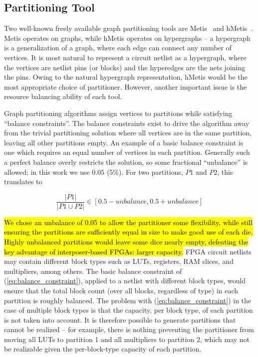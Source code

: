 \subsection{Partitioning Tool}
Two well-known freely available graph partitioning tools are Metis~\cite{karypis1998multilevelmetis} and hMetis~\cite{karypis1999multilevelhmetis}. Metis operates on graphs, while hMetis operates on hypergraphs -- a hypergraph is a generalization of a graph, where each edge can connect any number of vertices. It is most natural to represent a circuit netlist as a hypergraph, where the vertices are netlist pins (or blocks) and the hyperedges are the nets joining the pins. Owing to the natural hypergraph representation, hMetis would be the most appropriate choice of partitioner. However, another important issue is the resource balancing ability of each tool.

Graph partitioning algorithms assign vertices to partitions while satisfying ``balance constraints''. The balance constraints exist to drive the algorithm away from the trivial partitioning solution where all vertices are in the same partition, leaving all other partitions empty. An example of a basic balance constraint is one which requires an equal number of vertices in each partition. Generally such a perfect balance overly restricts the solution, so some fractional ``unbalance'' is allowed; in this work we use $0.05$ ($5\%$). For two partitions, $P1$ and $P2$, this translates to~\cite{karypismanual}

\begin{equation}\label{eq:balance_constraint}
\frac{|P1|}{|P1 \cup P2|} \in [0.5 - unbalance, 0.5 + unbalance]
\end{equation}

\hl{We chose an unbalance of 0.05 to allow the partitioner some flexibility, while still ensuring the partitions are sufficiently equal in size to make good use of each die. Highly unbalanced partitions would leave some dice nearly empty, defeating the key advantage of interposer-based FPGAs: larger capacity.} FPGA circuit netlists may contain different block types such as LUTs, registers, RAM slices, and multipliers, among others. The basic balance constraint of (\ref{eq:balance_constraint}), applied to a netlist with different block types, would ensure that the total block count (over all blocks, regardless of type) in each partition is roughly balanced. The problem with (\ref{eq:balance_constraint}) in the case of multiple block types is that the capacity, per block type, of each partition is not taken into account. It is therefore possible to generate partitions that cannot be realized -- for example, there is nothing preventing the partitioner from moving all LUTs to partition 1 and all multipliers to partition 2, which may not be realizable given the per-block-type capacity of each partition.

